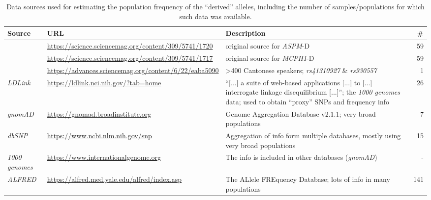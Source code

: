 \documentclass[twoside,onecolumn]{article}
\begin{document}
\begin{table}[h]
	\caption{Data sources used for estimating the population frequency of the ``derived'' alleles, including the number of samples/populations for which such data was available.}
	\label{Tab:gene_data_sources}
	\centering
	\begin{tabularx}{\textwidth}{|X|X|X|r|}
		\toprule
		\textbf{Source} & \textbf{URL} & \textbf{Description} & \textbf{\#} \\
		\midrule
		\citet{mekelbobrov_aspm_2005} & \url{https://science.sciencemag.org/content/309/5741/1720} & original source for \textit{ASPM}-D & 59 \\
		\citet{evans_microcephalin_2005} & \url{https://science.sciencemag.org/content/309/5741/1717} & original source for \textit{MCPH1}-D & 59 \\
		\citet{wong_sciadv_2020} & \url{https://advances.sciencemag.org/content/6/22/eaba5090} & >400 Cantonese speakers; \textit{rs41310927} \& \textit{rs930557} & 1 \\
		\textit{LDLink} & \url{https://ldlink.nci.nih.gov/?tab=home} & ``[...] a suite of web-based applications [...] to [...] interrogate linkage disequilibrium [...]''; the \textit{1000 genomes} data; used to obtain ``proxy'' SNPs and frequency info & 26 \\
		\textit{gnomAD} & \url{https://gnomad.broadinstitute.org} & Genome Aggregation Database v2.1.1; very broad populations & 7 \\
		\textit{dbSNP} & \url{https://www.ncbi.nlm.nih.gov/snp} & Aggregation of info form multiple databases, mostly using very broad populations & 15 \\
		\textit{1000 genomes} & \url{https://www.internationalgenome.org} & The info is included in other databases (\textit{gnomAD}) & - \\
		\textit{ALFRED} &	\url{https://alfred.med.yale.edu/alfred/index.asp} & The ALlele FREquency Database; lots of info in many populations & 141 \\
		\bottomrule
	\end{tabularx}
\end{table}
\end{document}
